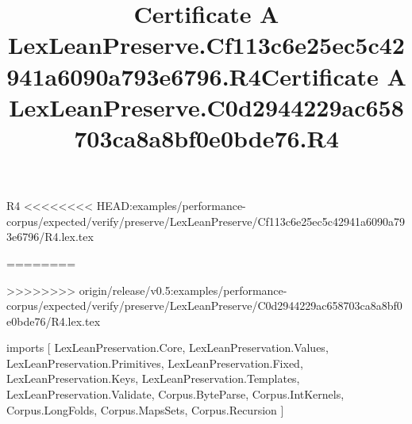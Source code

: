 \begin{lexlean}{R4}
<<<<<<<< HEAD:examples/performance-corpus/expected/verify/preserve/LexLeanPreserve/Cf113c6e25ec5c42941a6090a793e6796/R4.lex.tex
\title{Certificate A LexLeanPreserve.Cf113c6e25ec5c42941a6090a793e6796.R4}
========
\title{Certificate A LexLeanPreserve.C0d2944229ac658703ca8a8bf0e0bde76.R4}
>>>>>>>> origin/release/v0.5:examples/performance-corpus/expected/verify/preserve/LexLeanPreserve/C0d2944229ac658703ca8a8bf0e0bde76/R4.lex.tex
\begin{coremodule}
imports [
  LexLeanPreservation.Core,
  LexLeanPreservation.Values,
  LexLeanPreservation.Primitives,
  LexLeanPreservation.Fixed,
  LexLeanPreservation.Keys,
  LexLeanPreservation.Templates,
  LexLeanPreservation.Validate,
  Corpus.ByteParse,
  Corpus.IntKernels,
  Corpus.LongFolds,
  Corpus.MapsSets,
  Corpus.Recursion
]


\end{coremodule}
\end{lexlean}
